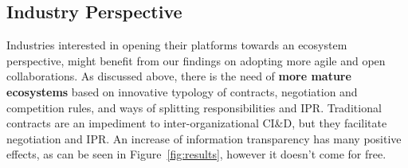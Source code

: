 
\vspace{-.1cm}

\subsection{Industry Perspective}\label{sec:industry}

Industries %
interested in %
opening their platforms towards an ecosystem perspective, %
might benefit from our findings %
on adopting more agile and open collaborations. %
As discussed above, there is the need of {\bf more mature ecosystems} based on innovative typology of contracts, negotiation and competition rules, and ways of splitting responsibilities and IPR. 
Traditional contracts are an impediment to inter-organizational CI\&D, but they facilitate negotiation and IPR. %
An increase of information transparency has many positive effects, as can be seen in Figure~\ref{fig:results}, however it doesn't come for free.

